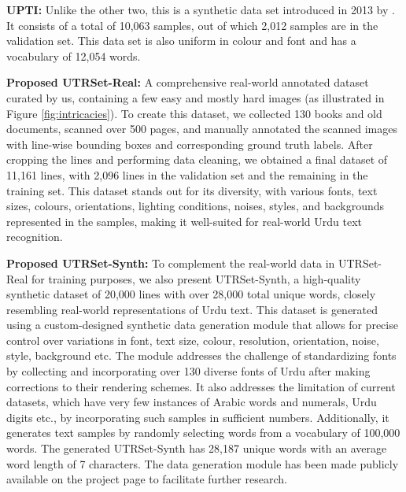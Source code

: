 \documentclass[runningheads]{llncs}
\newcommand{\DatasetNameReal}{{UTRSet-Real}\xspace}
\newcommand{\DatasetNameSynth}{{UTRSet-Synth}\xspace}
\newcommand{\mypara}[1]{\vspace{0.5em} \noindent \textbf{#1:}}
\begin{document}
\mypara{UPTI}
Unlike the other two, this is a synthetic data set introduced in 2013 by \cite{upti_paper}. It consists of a total of 10,063 samples, out of which 2,012 samples are in the validation set. This data set is also uniform in colour and font and has a vocabulary of 12,054 words.

\mypara{Proposed \DatasetNameReal}
A comprehensive real-world annotated dataset curated by us, containing a few easy and mostly hard images (as illustrated in Figure \ref{fig:intricacies}). To create this dataset, we collected 130 books and old documents, scanned over 500 pages, and manually annotated the scanned images with line-wise bounding boxes and corresponding ground truth labels. After cropping the lines and performing data cleaning, we obtained a final dataset of 11,161 lines, with 2,096 lines in the validation set and the remaining in the training set. This dataset stands out for its diversity, with various fonts, text sizes, colours, orientations, lighting conditions, noises, styles, and backgrounds represented in the samples, making it well-suited for real-world Urdu text recognition.

\mypara{Proposed \DatasetNameSynth}
To complement the real-world data in \DatasetNameReal for training purposes, we also present \DatasetNameSynth, a high-quality synthetic dataset of 20,000 lines with over 28,000 total unique words, closely resembling real-world representations of Urdu text. This dataset is generated using a custom-designed synthetic data generation module that allows for precise control over variations in font, text size, colour, resolution, orientation, noise, style, background etc. The module addresses the challenge of standardizing fonts by collecting and incorporating over 130 diverse fonts of Urdu after making corrections to their rendering schemes. It also addresses the limitation of current datasets, which have very few instances of Arabic words and numerals, Urdu digits etc., by incorporating such samples in sufficient numbers. Additionally, it generates text samples by randomly selecting words from a vocabulary of 100,000 words. The generated \DatasetNameSynth has 28,187 unique words with an average word length of 7 characters. The data generation module has been made publicly available on the project page to facilitate further research.
\end{document}
